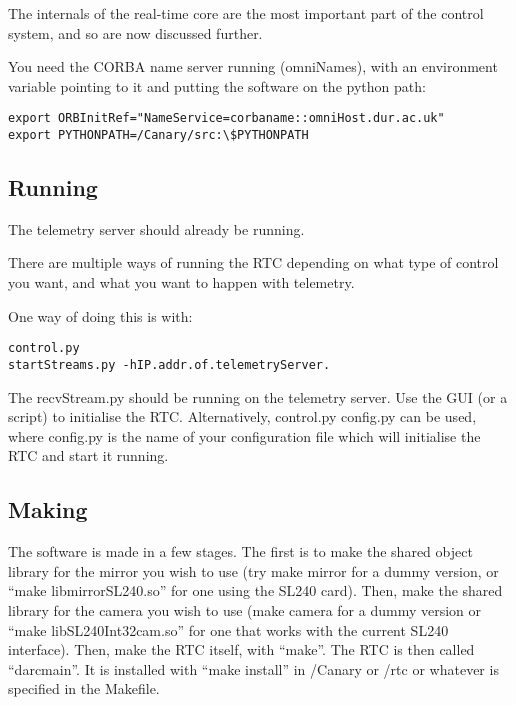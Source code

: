 \documentclass[a4,10pt]{article}
\newcommand{\ignore}[1]{}
\begin{document}
The internals of the real-time core are the most important part of the
control system, and so are now discussed further.

\ignore{
To run the RTC, you should use:
control.py  \#On the real-time computer
python recvStream.py \#Preferably on the telemetry server computer
python startStreams.py \#On the real-time computer
rtcgui.py \#Wherever you like.
}

You need the CORBA name server running (omniNames), with an
environment variable pointing to it and putting the software on the
python path:
\begin{verbatim}
export ORBInitRef="NameService=corbaname::omniHost.dur.ac.uk"
export PYTHONPATH=/Canary/src:\$PYTHONPATH
\end{verbatim}

\subsection{Running}
The telemetry server should already be running.

There are multiple ways of running the RTC depending on what type of
control you want, and what you want to happen with telemetry.

One way of doing this is with:

\begin{verbatim}
control.py 
startStreams.py -hIP.addr.of.telemetryServer.
\end{verbatim}


The recvStream.py should be running on the telemetry server.
Use the GUI (or a script) to initialise the RTC.
Alternatively, control.py config.py can be used, where config.py is
the name of your configuration file which will initialise the RTC and
start it running.

\subsection{Making}
The software is made in a few stages.  The first is to make the shared
object library for the mirror you wish to use (try make mirror for a
dummy version, or ``make libmirrorSL240.so'' for one using the SL240 card).
Then, make the shared library for the camera you wish to use (make
camera for a dummy version or ``make libSL240Int32cam.so'' for one that works
with the current SL240 interface).  Then, make the RTC itself, with
``make''.  The RTC is then called ``darcmain''.  It is installed with
``make install'' in /Canary or /rtc or whatever is specified in the Makefile.
\end{document}
